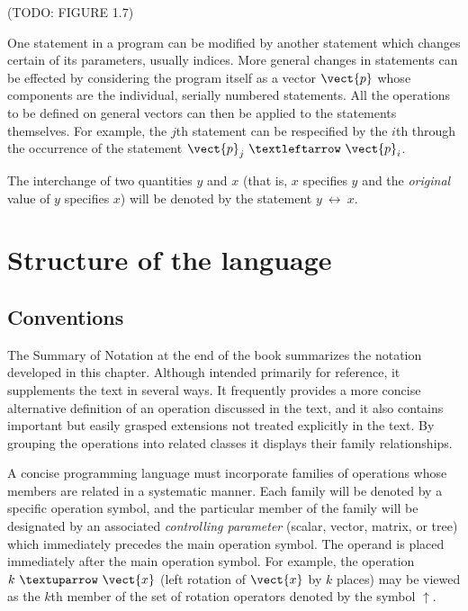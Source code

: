 \par (TODO: FIGURE 1.7)

\par One statement in a program can be modified by another statement which changes certain of its parameters, usually indices. More general changes in statements can be effected by considering the program itself as a vector $\vect{p}$ whose components are the individual, serially numbered statements. All the operations to be defined on general vectors can then be applied to the statements themselves. For example, the $j$th statement can be respecified by the $i$th through the occurrence of the statement $\vect{p}_j\ ←\ \vect{p}_i$.

\par The interchange of two quantities $y$ and $x$ (that is, $x$ specifies $y$ and the \textit{original} value of $y$ specifies $x$) will be denoted by the statement $y\ \leftrightarrow\ x$.

\section{Structure of the language}

\subsection*{Conventions}

\par The Summary of Notation at the end of the book summarizes the notation developed in this chapter. Although intended primarily for reference, it supplements the text in several ways. It frequently provides a more concise alternative definition of an operation discussed in the text, and it also contains important but easily grasped extensions not treated explicitly in the text. By grouping the operations into related classes it displays their family relationships.

\par A concise programming language must incorporate families of operations whose members are related in a systematic manner. Each family will be denoted by a specific operation symbol, and the particular member of the family will be designated by an associated \textit{controlling parameter} (scalar, vector, matrix, or tree) which immediately precedes the main operation symbol. The operand is placed immediately after the main operation symbol. For example, the operation $k\ ↑\ \vect{x}$ (left rotation of $\vect{x}$ by $k$ places) may be viewed as the $k$th member of the set of rotation operators denoted by the symbol $↑$.

